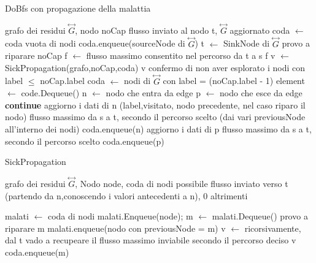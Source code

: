 \documentclass{article}
\begin{document}
\begin{algorithm}
\caption{DoBfs con propagazione della malattia}
\begin{algorithmic}
\REQUIRE grafo dei residui $\overset{\leftrightarrow}{G}$, nodo noCap
\ENSURE flusso inviato al nodo t, $\overset{\leftrightarrow}{G}$ aggiornato
\STATE coda $\leftarrow$ coda vuota di nodi
\STATE coda.enqueue(sourceNode di $\overset{\leftrightarrow}{G}$)
\ELSE
\STATE t $\leftarrow$ SinkNode di $\overset{\leftrightarrow}{G}$
\STATE provo a riparare noCap 
\STATE f $\leftarrow$ flusso massimo consentito nel percorso da t a s 
\RETURN f
\ENDIF
\ENDIF
\STATE v $\leftarrow$ SickPropagation(grafo,noCap,coda)
\RETURN v
\ENDIF
\STATE confermo di non aver esplorato i nodi con label $\leq$ noCap.label
\STATE coda $\leftarrow$ nodi di $\overset{\leftrightarrow}{G}$ con label = (noCap.label - 1)
\ENDIF
\ENDIF
{}
\STATE element $\leftarrow$ code.Dequeue()
\STATE n $\leftarrow$ nodo che entra da edge
\STATE p $\leftarrow$ nodo che esce da edge
\STATE \textbf{continue}
\ENDIF
{}
\STATE aggiorno i dati di n (label,visitato, nodo precedente, nel caso riparo il nodo)
\RETURN flusso massimo da s a t, secondo il percorso scelto (dai vari previousNode all'interno dei nodi)
\ELSE
\STATE coda.enqueue(n)
\ENDIF
{}
\STATE aggiorno i dati di p
\RETURN flusso massimo da s a t, secondo il percorso scelto
\ELSE
\STATE coda.enqueue(p)
\ENDIF
\ENDIF
\ENDFOR
\ENDWHILE
{}

\end{algorithmic}
\end{algorithm}
\begin{algorithm}
\caption{SickPropagation}
\begin{algorithmic}
\REQUIRE grafo dei residui $\overset{\leftrightarrow}{G}$, Nodo node, coda di nodi
\ENSURE possibile flusso inviato verso t (partendo da n,conoscendo i valori antecedenti a n), 0 altrimenti

\STATE malati $\leftarrow$ coda di nodi
\STATE malati.Enqueue(node);
\STATE m $\leftarrow$ malati.Dequeue()
\STATE provo a riparare m
\STATE malati.enqueue(nodo con previousNode = m)
\STATE v $\leftarrow$ ricorsivamente, dal t vado a recupeare il flusso massimo inviabile secondo il percorso deciso
\RETURN v
\ELSE
\STATE coda.enqueue(m)
\ENDIF
\ENDWHILE
{}
\end{algorithmic}
\end{algorithm}
\end{document}
